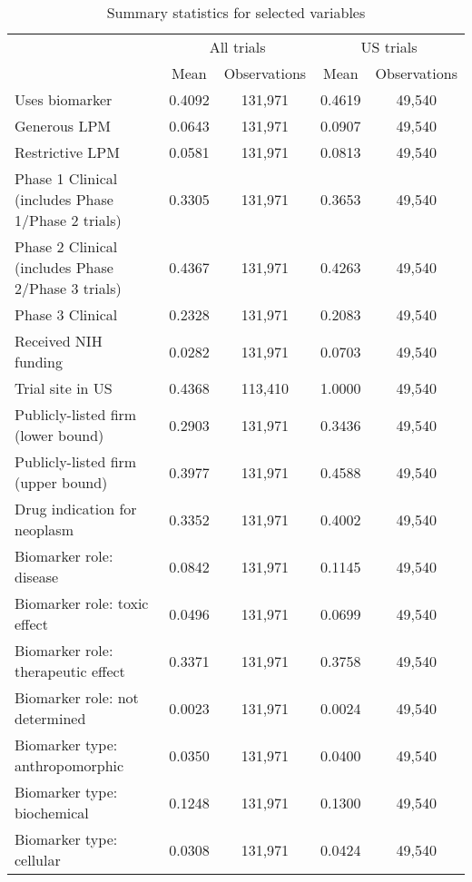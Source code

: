 \begin{table}[htbp]\centering
\def\sym#1{\ifmmode^{#1}\else\(^{#1}\)\fi}
\caption{Summary statistics for selected variables}
\begin{tabular}{l*{2}{cc}}
\hline\hline
                    &\multicolumn{2}{c}{All trials}&\multicolumn{2}{c}{US trials}\\
                    &        Mean&Observations&        Mean&Observations\\
\hline
Uses biomarker      &      0.4092&     131,971&      0.4619&      49,540\\
Generous LPM        &      0.0643&     131,971&      0.0907&      49,540\\
Restrictive LPM     &      0.0581&     131,971&      0.0813&      49,540\\
Phase 1 Clinical (includes Phase 1/Phase 2 trials)&      0.3305&     131,971&      0.3653&      49,540\\
Phase 2 Clinical (includes Phase 2/Phase 3 trials)&      0.4367&     131,971&      0.4263&      49,540\\
Phase 3 Clinical    &      0.2328&     131,971&      0.2083&      49,540\\
Received NIH funding&      0.0282&     131,971&      0.0703&      49,540\\
Trial site in US    &      0.4368&     113,410&      1.0000&      49,540\\
Publicly-listed firm (lower bound)&      0.2903&     131,971&      0.3436&      49,540\\
Publicly-listed firm (upper bound)&      0.3977&     131,971&      0.4588&      49,540\\
Drug indication for neoplasm&      0.3352&     131,971&      0.4002&      49,540\\
Biomarker role: disease&      0.0842&     131,971&      0.1145&      49,540\\
Biomarker role: toxic effect&      0.0496&     131,971&      0.0699&      49,540\\
Biomarker role: therapeutic effect&      0.3371&     131,971&      0.3758&      49,540\\
Biomarker role: not determined&      0.0023&     131,971&      0.0024&      49,540\\
Biomarker type: anthropomorphic&      0.0350&     131,971&      0.0400&      49,540\\
Biomarker type: biochemical&      0.1248&     131,971&      0.1300&      49,540\\
Biomarker type: cellular&      0.0308&     131,971&      0.0424&      49,540\\

\end{tabular}
\end{table}
